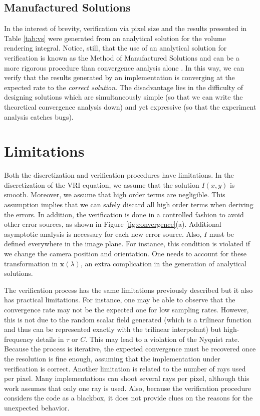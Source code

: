 \subsection{Manufactured Solutions}

%
In the interest of brevity, verification via pixel size and the
results presented in Table \ref{tab:vs} were generated from an
analytical solution for the volume rendering integral. Notice, still,
that the use of an analytical solution for verification is known as
the Method of Manufactured Solutions \cite{babuska04} and can be a
more rigorous procedure than convergence analysis alone
\cite{Roy2005}. 
In this way, we can verify that the results generated
by an implementation is converging at the expected rate to the
\emph{correct solution}. 
The disadvantage lies in the difficulty of
designing solutions which are simultaneously simple (so
that we can write the theoretical convergence analysis down) and
yet expressive (so that the experiment analysis catches bugs).

\section{Limitations}
\label{sec:limitations}
 
Both the discretization and verification procedures have
limitations. In the discretization of the VRI equation, we assume that
the solution $I(x,y)$ is smooth. Moreover, we assume that high order
terms are negligible. This assumption implies that we can safely
discard all high order terms when deriving the errors.  In addition,
the verification is done in a controlled fashion to avoid other error
sources, as shown in 
Figure \ref{fig:convergence}(a). Additional asymptotic analysis 
is necessary for each new error source. Also, $I$ must
be defined everywhere in the image plane. For instance, this condition
is violated if we change the camera position and orientation. One
needs to account for these transformation in $\mathbf{x}(\lambda)$, an
extra complication in the generation of analytical solutions.

The verification process has the same limitations previously described
but it also has practical limitations. For instance, one may be able
to observe that the convergence rate may not be the expected one for
low sampling rates. However, this is not due to the random scalar
field generated (which is a trilinear function and thus can be
represented exactly with the trilinear interpolant) but
high-frequency details in $\tau$ or $C$. This may lead to a violation
of the Nyquist rate. Because the process is iterative, 
the expected convergence must be recovered once the
resolution is fine enough, assuming that the implementation under
verification is correct.
Another limitation is related to the number of
rays used per pixel. Many implementations can shoot several rays per
pixel, although this work assumes that only one ray is used. Also,
because the verification procedure considers the code as a blackbox,
it does not provide clues on the reasons for the unexpected behavior.

